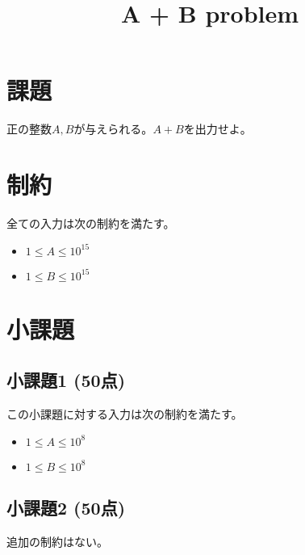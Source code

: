 \documentclass[10pt,a4j,notitlepage,uplatex]{jsarticle}
\title{A + B problem}
\begin{document}
\section{課題}

正の整数$A, B$が与えられる。$A + B$を出力せよ。

\section{制約}

全ての入力は次の制約を満たす。
\begin{itemize}
  \item $1 \leq A \leq 10^{15}$
  \item $1 \leq B \leq 10^{15}$
\end{itemize}

\section{小課題}

\subsection{小課題1 (50点)}

この小課題に対する入力は次の制約を満たす。
\begin{itemize}
  \item $1 \leq A \leq 10^8$
  \item $1 \leq B \leq 10^8$
\end{itemize}

\subsection{小課題2 (50点)}

追加の制約はない。
\end{document}
